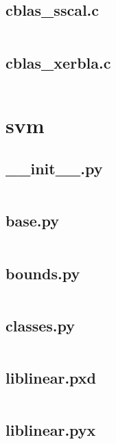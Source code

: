 \documentclass{article}
\begin{document}
\subsection{cblas\_sscal.c}
\inputminted{c}{/home/dufferzafar/dev/@clones/scikit-learn/sklearn/src/cblas/cblas_sscal.c}
\newpage

\subsection{cblas\_xerbla.c}
\inputminted{c}{/home/dufferzafar/dev/@clones/scikit-learn/sklearn/src/cblas/cblas_xerbla.c}
\newpage

\section{svm}

\subsection{\_\_init\_\_.py}
\inputminted{python}{/home/dufferzafar/dev/@clones/scikit-learn/sklearn/svm/__init__.py}
\newpage

\subsection{base.py}
\inputminted{python}{/home/dufferzafar/dev/@clones/scikit-learn/sklearn/svm/base.py}
\newpage

\subsection{bounds.py}
\inputminted{python}{/home/dufferzafar/dev/@clones/scikit-learn/sklearn/svm/bounds.py}
\newpage

\subsection{classes.py}
\inputminted{python}{/home/dufferzafar/dev/@clones/scikit-learn/sklearn/svm/classes.py}
\newpage

\subsection{liblinear.pxd}
\inputminted{cython}{/home/dufferzafar/dev/@clones/scikit-learn/sklearn/svm/liblinear.pxd}
\newpage

\subsection{liblinear.pyx}
\inputminted{cython}{/home/dufferzafar/dev/@clones/scikit-learn/sklearn/svm/liblinear.pyx}
\newpage
\end{document}
